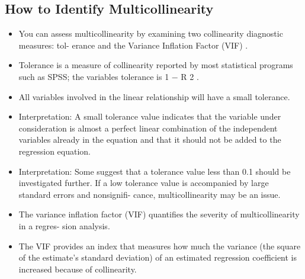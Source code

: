 \documentclass[]{report}
\begin{document}
\subsection{How to Identify Multicollinearity}
\begin{itemize}
\item You can assess multicollinearity by examining two collinearity diagnostic measures: tol-
erance and the Variance Inflation Factor (VIF) .
\item Tolerance is a measure of collinearity reported by most statistical programs such as SPSS;
the variables tolerance is 1 − R 2 .
\item All variables involved in the linear relationship will have a small tolerance.
\item Interpretation: A small tolerance value indicates that the variable under consideration
is almost a perfect linear combination of the independent variables already in the equation
and that it should not be added to the regression equation.
\item Interpretation: Some suggest that a tolerance value less than 0.1 should be investigated
further. If a low tolerance value is accompanied by large standard errors and nonsignifi-
cance, multicollinearity may be an issue.
\item The variance inflation factor (VIF) quantifies the severity of multicollinearity in a regres-
sion analysis.
\item The VIF provides an index that measures how much the variance (the square of the
estimate’s standard deviation) of an estimated regression coefficient is increased because
of collinearity.
\end{itemize}
\end{document}
